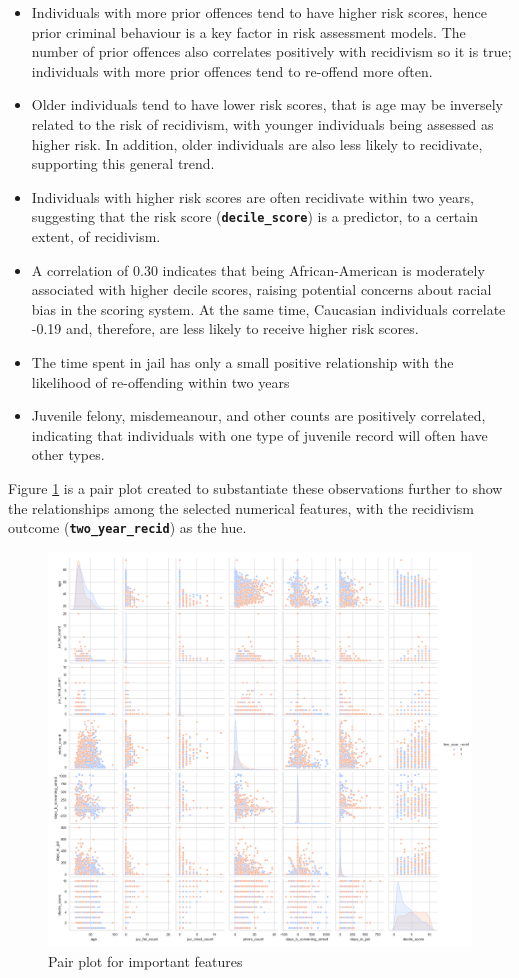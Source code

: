 \begin{itemize}
	\item Individuals with more prior offences tend to have higher risk scores, hence prior criminal behaviour is a key factor in risk assessment models. The number of prior offences also correlates positively with recidivism so it is true; individuals with more prior offences tend to re-offend more often.
	
	\item Older individuals tend to have lower risk scores, that is age may be inversely related to the risk of recidivism, with younger individuals being assessed as higher risk. In addition, older individuals are also less likely to recidivate, supporting this general trend.
	
	\item Individuals with higher risk scores are often recidivate within two years, suggesting that the risk score (\textbf{\texttt{decile\_score}}) is a predictor, to a certain extent, of recidivism.
	
	\item A correlation of 0.30 indicates that being African-American is moderately associated with higher decile scores, raising potential concerns about racial bias in the scoring system. At the same time, Caucasian individuals correlate -0.19 and, therefore, are less likely to receive higher risk scores.
	
	\item The time spent in jail has only a small positive relationship with the likelihood of re-offending within two years
	
	\item  Juvenile felony, misdemeanour, and other counts are positively correlated, indicating that individuals with one type of juvenile record will often have other types.
\end{itemize}

Figure \ref{fig:pairplot} is a pair plot created to substantiate these observations further to show the relationships among the selected numerical features, with the recidivism outcome (\textbf{\texttt{two\_year\_recid}}) as the hue.

\begin{figure}
	\centering
	\includegraphics[width=0.7\linewidth]{img/pair_plot}
	\caption{Pair plot for important features}
	\label{fig:pairplot}
\end{figure}



